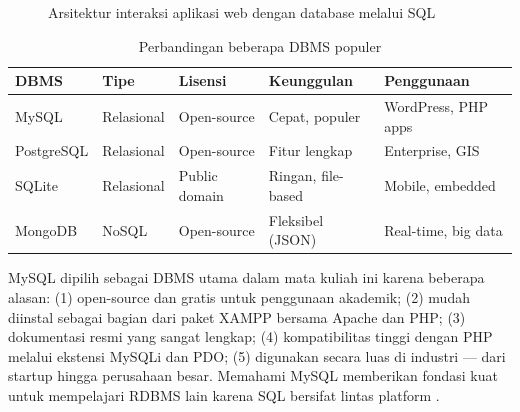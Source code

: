 \begin{figure}[ht]
\centering
{}
\caption{Arsitektur interaksi aplikasi web dengan database melalui SQL}
\end{figure}

\begin{table}[ht]
\centering
\begin{tabular}{|P{2.5cm}|P{2cm}|P{2.5cm}|P{2.5cm}|P{2.5cm}|}
\hline
\textbf{DBMS} & \textbf{Tipe} & \textbf{Lisensi} & \textbf{Keunggulan} & \textbf{Penggunaan} \\
\hline
MySQL & Relasional & Open-source & Cepat, populer & WordPress, PHP apps \\
\hline
PostgreSQL & Relasional & Open-source & Fitur lengkap & Enterprise, GIS \\
\hline
SQLite & Relasional & Public domain & Ringan, file-based & Mobile, embedded \\
\hline
MongoDB & NoSQL & Open-source & Fleksibel (JSON) & Real-time, big data \\
\hline
\end{tabular}
\caption{Perbandingan beberapa DBMS populer}
\end{table}

MySQL dipilih sebagai DBMS utama dalam mata kuliah ini karena beberapa alasan: (1) open-source dan gratis untuk penggunaan akademik; (2) mudah diinstal sebagai bagian dari paket XAMPP bersama Apache dan PHP; (3) dokumentasi resmi yang sangat lengkap; (4) kompatibilitas tinggi dengan PHP melalui ekstensi MySQLi dan PDO; (5) digunakan secara luas di industri --- dari startup hingga perusahaan besar. Memahami MySQL memberikan fondasi kuat untuk mempelajari RDBMS lain karena SQL bersifat lintas platform \cite{mysqlDocs}.


